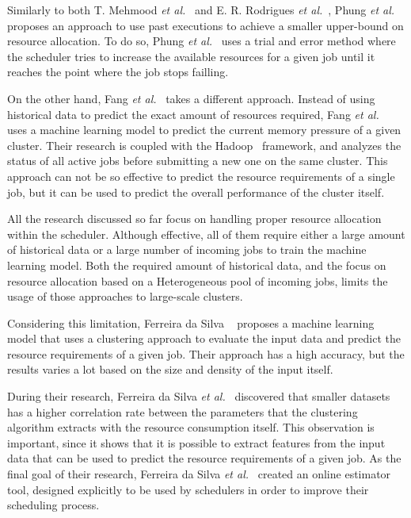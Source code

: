 Similarly to both T. Mehmood \emph{et al.}~\cite{mehmood2018} and E. R. Rodrigues \emph{et al.}~\cite{rodrigues2016}, Phung \emph{et al.}~\cite{phung2021} proposes an approach to use past executions to achieve a smaller upper-bound on resource allocation.
To do so, Phung \emph{et al.}~\cite{phung2021} uses a trial and error method where the scheduler tries to increase the available resources for a given job until it reaches the point where the job stops failling.

On the other hand, Fang \emph{et al.}~\cite{fang2018} takes a different approach.
Instead of using historical data to predict the exact amount of resources required, Fang \emph{et al.}~\cite{fang2018} uses a machine learning model to predict the current memory pressure of a given cluster.
Their research is coupled with the Hadoop~\cite{hadoop} framework, and analyzes the status of all active jobs before submitting a new one on the same cluster.
This approach can not be so effective to predict the resource requirements of a single job, but it can be used to predict the overall performance of the cluster itself.

All the research discussed so far focus on handling proper resource allocation within the scheduler.
Although effective, all of them require either a large amount of historical data or a large number of incoming jobs to train the machine learning model.
Both the required amount of historical data, and the focus on resource allocation based on a Heterogeneous pool of incoming jobs, limits the usage of those approaches to large-scale clusters.

Considering this limitation, Ferreira da Silva ~\cite{ferreira2013} proposes a machine learning model that uses a clustering approach to evaluate the input data and predict the resource requirements of a given job.
Their approach has a high accuracy, but the results varies a lot based on the size and density of the input itself.

During their research, Ferreira da Silva \emph{et al.}~\cite{ferreira2013} discovered that smaller datasets has a higher correlation rate between the parameters that the clustering algorithm extracts with the resource consumption itself.
This observation is important, since it shows that it is possible to extract features from the input data that can be used to predict the resource requirements of a given job.
As the final goal of their research, Ferreira da Silva \emph{et al.}~\cite{ferreira2013} created an online estimator tool, designed explicitly to be used by schedulers in order to improve their scheduling process.

